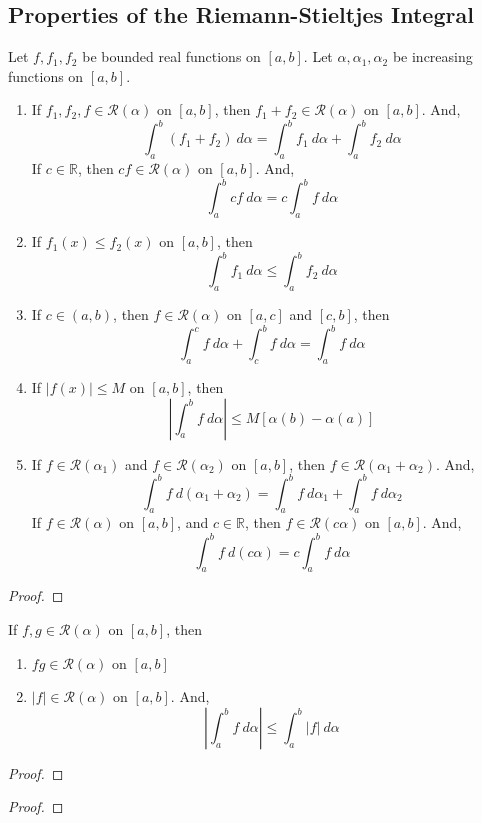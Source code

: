 \subsection{Properties of the Riemann-Stieltjes Integral}
\begin{theorem}
	Let $f,f_1,f_2$ be bounded real functions on $[a,b]$.
	Let $\alpha,\alpha_1,\alpha_2$ be increasing functions on $[a,b]$.
	\begin{enumerate}
		\item If $f_1,f_2,f \in \mathscr{R}(\alpha)$ on $[a,b]$, then $f_1+f_2 \in \mathscr{R}(\alpha)$ on $[a,b]$.
			And,
			\[ \int_a^b \left( f_1 + f_2 \right)\ d\alpha = \int_a^b f_1\ d\alpha + \int_a^b f_2\ d\alpha \]
			If $c \in \mathbb{R}$, then $cf \in \mathscr{R}(\alpha)$ on $[a,b]$.
			And,
			\[ \int_a^b cf\ d\alpha = c\int_a^b f\ d\alpha \]
		\item If $f_1(x) \le f_2(x)$ on $[a,b]$, then
			\[ \int_a^b f_1\ d\alpha \le \int_a^b f_2\ d\alpha \]
		\item If $c \in (a,b)$, then $f \in \mathscr{R}(\alpha)$ on $[a,c]$ and $[c,b]$, then
			\[ \int_a^c f\ d\alpha + \int_c^b f\ d\alpha = \int_a^b f\ d\alpha \]
		\item If $|f(x)| \le M$ on $[a,b]$, then 
			\[ \left| \int_a^b f\ d\alpha \right| \le M[\alpha(b)-\alpha(a)] \]
		\item If $f \in \mathscr{R}(\alpha_1)$ and $f \in \mathscr{R}(\alpha_2)$ on $[a,b]$, then $f \in \mathscr{R}(\alpha_1+\alpha_2)$.
			And,
			\[ \int_a^b f\ d(\alpha_1+\alpha_2) = \int_a^b f\ d\alpha_1 + \int_a^b f\ d\alpha_2 \]
			If $f \in \mathscr{R}(\alpha)$ on $[a,b]$, and $c \in \mathbb{R}$, then $f \in \mathscr{R}(c\alpha)$ on $[a,b]$.
			And,
			\[ \int_a^b f\ d(c\alpha) = c\int_a^b f\ d\alpha \]
	\end{enumerate}
\end{theorem}
\begin{proof}
\end{proof}

\begin{theorem}
	If $f,g \in \mathscr{R}(\alpha)$ on $[a,b]$, then
	\begin{enumerate}
		\item $fg \in \mathscr{R}(\alpha)$ on $[a,b]$
		\item $|f| \in \mathscr{R}(\alpha)$ on $[a,b]$.
			And,
			\[ \left| \int_a^b f\ d\alpha \right| \le \int_a^b |f|\ d\alpha \]
	\end{enumerate}
\end{theorem}
\begin{proof}
\end{proof}

\begin{theorem}
\end{theorem}
\begin{proof}
\end{proof}
